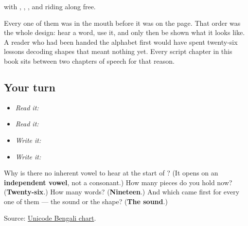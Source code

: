 with \textbf{}, \textbf{}, \textbf{}, \textbf{} and \textbf{} riding along free.

Every one of them was in the mouth before it was on the page. That order was the whole design: hear a word, use it, and only then be shown what it looks like. A reader who had been handed the alphabet first would have spent twenty-six lessons decoding shapes that meant nothing yet. Every script chapter in this book sits between two chapters of speech for that reason.

\subsection*{Your turn}
\begin{itemize}
\raggedright
  \item \emph{Read it:}     
  \item \emph{Read it:}  
  \item \emph{Write it:} 
  \item \emph{Write it:}        
\end{itemize}

\begin{tcolorbox}[breakable,colback=teal!4,colframe=teal!35!black,title={Before you move on}]
Why is there no inherent vowel to hear at the start of \textbf{}? (It opens on an \textbf{independent vowel}, not a consonant.) How many pieces do you hold now? (\textbf{Twenty-six}.) How many words? (\textbf{Nineteen}.) And which came first for every one of them — the sound or the shape? (\textbf{The sound}.)

Source: \href{https://www.unicode.org/charts/PDF/U0980.pdf}{Unicode Bengali chart}.
\end{tcolorbox}
